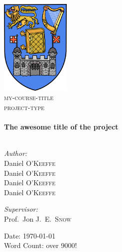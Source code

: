 \begin{titlepage}
\begin{center}
\includegraphics[width=0.25\textwidth]{images/trinity-logo}~\\[1cm]
\textsc{\LARGE my-course-title}\\[1.5cm]
\textsc{\Large project-type}\\[0.5cm]
\HRule \\[0.4cm]
{\huge \bfseries The awesome title of the project}\\%
\HRule \\[1.5cm]
\begin{minipage}[t]{0.4\textwidth}
\begin{flushleft} \large
\emph{Author:}\\
Daniel \textsc{O'Keeffe}\\
Daniel \textsc{O'Keeffe}\\
Daniel \textsc{O'Keeffe}\\
Daniel \textsc{O'Keeffe}
\end{flushleft}
\end{minipage}
\begin{minipage}[t]{0.4\textwidth}
\begin{flushright} \large
\emph{Supervisor:} \\
Prof.~Jon J.~E.~\textsc{Snow}
\end{flushright}
\end{minipage}
\vfill
{\large Date: \today}\\
{\large Word Count: over 9000!}
\end{center}
\end{titlepage}
